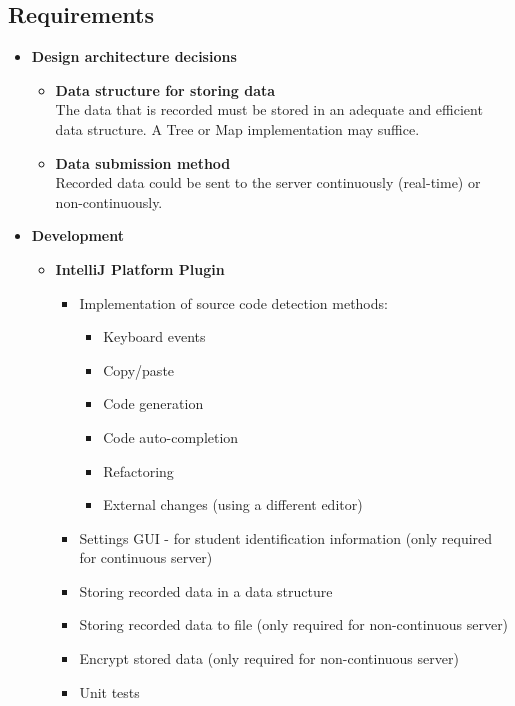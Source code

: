 \subsection{Requirements}
\begin{itemize}
  \item \textbf{Design architecture decisions}
  \begin{itemize}
    \item \textbf{Data structure for storing data}\\The data that is recorded must be stored in an adequate and efficient data structure. A Tree or Map implementation may suffice.
    \item \textbf{Data submission method}\\Recorded data could be sent to the server continuously (real-time) or non-continuously.
  \end{itemize}

  \item \textbf{Development}
  \begin{itemize}
    \item \textbf{IntelliJ Platform Plugin}
    \begin{itemize}
      \item Implementation of source code detection methods:
      \begin{itemize}
        \item Keyboard events
        \item Copy/paste
        \item Code generation
        \item Code auto-completion
        \item Refactoring
        \item External changes (using a different editor)
      \end{itemize}
      \item Settings GUI - for student identification information (only required for continuous server)
      \item Storing recorded data in a data structure 
      \item Storing recorded data to file (only required for non-continuous server)
      \item Encrypt stored data (only required for non-continuous server)
      \item Unit tests
    \end{itemize}


\end{itemize}
\end{itemize}
